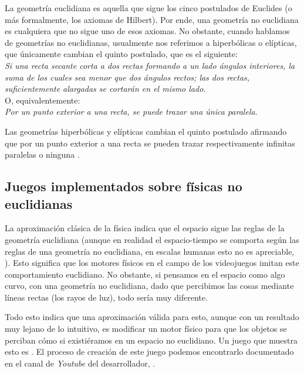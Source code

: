 
La geometría euclidiana es aquella que sigue los cinco postulados de Euclides (o más formalmente, los axiomas de Hilbert). Por ende, una geometría no euclidiana es cualquiera que no sigue uno de esos axiomas. No obstante, cuando hablamos de geometrías no euclidianas, usualmente nos referimos a hiperbólicas o elípticas, que únicamente cambian el quinto postulado, que es el siguiente:
\\
\textit{Si una recta secante corta a dos rectas formando a un lado ángulos interiores, la suma de los cuales sea menor que dos ángulos rectos; las dos rectas, suficientemente alargadas se cortarán en el mismo lado.}
\\
O, equivalentemente: \\
\textit{Por un punto exterior a una recta, se puede trazar una única paralela.}

Las geometrías hiperbólicas y elípticas cambian el quinto postulado afirmando que por un punto exterior a una recta se pueden trazar respectivamente infinitas paralelas o ninguna \citep{coxeter}.

\subsection{Juegos implementados sobre físicas no euclidianas}
La aproximación clásica de la física indica que el espacio sigue las reglas de la geometría euclidiana (aunque en realidad el espacio-tiempo se comporta según las reglas de una geometría no euclidiana, en escalas humanas esto no es apreciable, \cite{einstein}). Esto significa que los motores físicos en el campo de los videojuegos imitan este comportamiento euclidiano. No obstante, si pensamos en el espacio como algo curvo, con una geometría no euclidiana, dado que percibimos las cosas mediante líneas rectas (los rayos de luz), todo sería muy diferente.

Todo esto indica que una aproximación válida para esto, aunque con un resultado muy lejano de lo intuitivo, es modificar un motor físico para que los objetos se perciban cómo si existiéramos en un espacio no euclidiano. Un juego que muestra esto es \cite{hyperbolica} . El proceso de creación de este juego podemos encontrarlo documentado en el canal de \textit{Youtube} del desarrollador, \cite{hyperbolica_devlog}.

